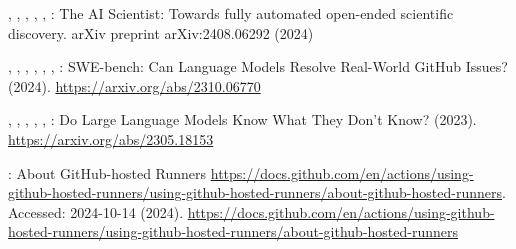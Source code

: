 \documentclass[sn-mathphys-num]{sn-jnl}%
\theoremstyle{thmstyleone}%
\theoremstyle{thmstyletwo}%
\theoremstyle{thmstylethree}%
\begin{document}
\begin{thebibliography}{10}
\begin{botherref}
,
,
,
,
,
:
The {AI} {S}cientist: Towards fully automated open-ended scientific discovery.
arXiv preprint arXiv:2408.06292
(2024)
\end{botherref}
\endbibitem

\begin{botherref}
,
,
,
,
,
,
:
SWE-bench: Can Language Models Resolve Real-World GitHub Issues?
(2024).
\url{https://arxiv.org/abs/2310.06770}
\end{botherref}
\endbibitem

\begin{botherref}
,
,
,
,
,
:
Do Large Language Models Know What They Don't Know?
(2023).
\url{https://arxiv.org/abs/2305.18153}
\end{botherref}
\endbibitem

\begin{botherref}
:
About GitHub-hosted Runners
  \url{https://docs.github.com/en/actions/using-github-hosted-runners/using-github-hosted-runners/about-github-hosted-runners}.
Accessed: 2024-10-14
(2024).
\url{https://docs.github.com/en/actions/using-github-hosted-runners/using-github-hosted-runners/about-github-hosted-runners}
\end{botherref}
\endbibitem

\end{thebibliography}
\end{document}
